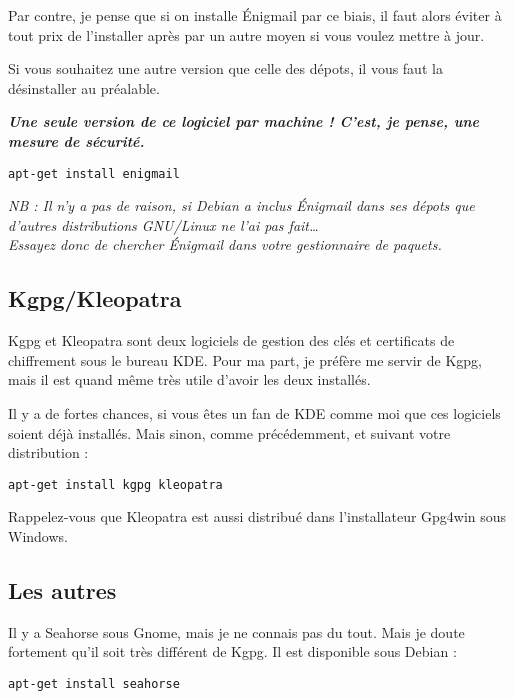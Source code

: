 Par contre, je pense que si on installe Énigmail par ce biais, il faut
alors éviter à tout prix de l'installer après par un autre moyen si vous
voulez mettre à jour.

Si vous souhaitez une autre version que celle des dépots, il vous faut
la désinstaller au préalable.

\textbf{\emph{Une seule version de ce logiciel par machine ! C'est, je
pense, une mesure de sécurité.}}

\begin{verbatim}
apt-get install enigmail
\end{verbatim}

\emph{NB : Il n'y a pas de raison, si Debian a inclus Énigmail dans ses
dépots que d'autres distributions GNU/Linux ne l'ai pas
fait\ldots{}\\Essayez donc de chercher Énigmail dans votre gestionnaire
de paquets.}

\subsection{Kgpg/Kleopatra}\label{kgpgkleopatra}

Kgpg et Kleopatra sont deux logiciels de gestion des clés et certificats
de chiffrement sous le bureau KDE. Pour ma part, je préfère me servir de
Kgpg, mais il est quand même très utile d'avoir les deux installés.

Il y a de fortes chances, si vous êtes un fan de KDE comme moi que ces
logiciels soient déjà installés. Mais sinon, comme précédemment, et
suivant votre distribution :

\begin{verbatim}
apt-get install kgpg kleopatra
\end{verbatim}

Rappelez-vous que Kleopatra est aussi distribué dans l'installateur
Gpg4win sous Windows.

\subsection{Les autres}\label{les-autres-1}

Il y a Seahorse sous Gnome, mais je ne connais pas du tout. Mais je
doute fortement qu'il soit très différent de Kgpg. Il est disponible
sous Debian :

\begin{verbatim}
apt-get install seahorse
\end{verbatim}
